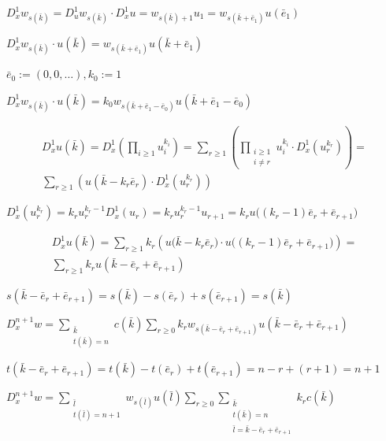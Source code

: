 \documentclass{article}
\begin{document}
\( D_{x}^{1}w_{s(\bar{k})} = D_{u}^{1}w_{s(\bar{k})} \cdot D_{x}^{1} u = w_{s(\bar{k}) + 1} u_{1} = w_{s(\bar{k} + \bar{e}_{1})} u(\bar{e}_{1}) \)

\( D_{x}^{1}w_{s(\bar{k})} \cdot u(\bar{k}) = w_{s(\bar{k} + \bar{e}_{1})} u(\bar{k} + \bar{e}_{1}) \)

\( \bar{e}_{0} := (0,0,\ldots), k_{0} := 1 \)

\( D_{x}^{1}w_{s(\bar{k})} \cdot u(\bar{k}) = k_{0} w_{s(\bar{k} + \bar{e}_{1} - \bar{e}_{0})} u(\bar{k} + \bar{e}_{1} - \bar{e}_{0}) \)

\begin{multline*}
D_{x}^{1} u(\bar{k}) = D_{x}^{1} \left(\prod_{i \geq 1}u_{i}^{k_{i}}\right) = \sum_{r \geq 1} \left(\prod_{\substack{i \geq 1\\ i \neq r}}u_{i}^{k_{i}} \cdot D_{x}^{1}(u_{r}^{k_{r}})\right) = \\
\sum_{r \geq 1} \left( u(\bar{k} - k_{r} \bar{e}_{r}) \cdot D_{x}^{1}(u_{r}^{k_{r}}) \right)
\end{multline*}

\( D_{x}^{1}(u_{r}^{k_{r}}) = k_{r} u_{r}^{k_{r}-1} D_{x}^{1}(u_{r}) = k_{r} u_{r}^{k_{r} - 1} u_{r+1} = k_{r} u\bigl((k_{r}-1)\bar{e}_{r} + \bar{e}_{r+1}\bigr) \)

\begin{multline*}
D_{x}^{1} u(\bar{k}) = \sum_{r \geq 1} k_{r} \left( u\bigl(\bar{k} - k_{r} \bar{e}_{r}\bigr) \cdot u\bigl((k_{r}-1)\bar{e}_{r} + \bar{e}_{r+1}\bigr) \right) = \\
\sum_{r \geq 1} k_{r} u(\bar{k} - \bar{e}_{r} + \bar{e}_{r+1})
\end{multline*}

\( s(\bar{k} - \bar{e}_{r} + \bar{e}_{r+1}) = s(\bar{k}) - s(\bar{e}_{r}) + s(\bar{e}_{r+1}) = s(\bar{k}) \)

\( D_{x}^{n+1}w = \sum_{\substack{\bar{k}\\ t(\bar{k}) = n}} c(\bar{k}) \sum_{r\geq 0} k_{r} w_{s(\bar{k} - \bar{e}_{r} + \bar{e}_{r+1})} u(\bar{k} - \bar{e}_{r} + \bar{e}_{r+1}) \)

\( t(\bar{k} - \bar{e}_{r} + \bar{e}_{r+1}) = t(\bar{k}) - t(\bar{e}_{r}) + t(\bar{e}_{r+1}) = n - r + (r+1) = n + 1 \)

\( D_{x}^{n+1} w = \sum_{\substack{\bar{l}\\ t(\bar{l}) = n + 1 \\ }} w_{s(\bar{l})} u(\bar{l}) \sum_{r \geq 0} \sum_{\substack{\bar{k}\\ t(\bar{k}) = n \\ \bar{l} = \bar{k} - \bar{e}_{r} + \bar{e}_{r+1}}} k_{r} c(\bar{k}) \)
\end{document}
